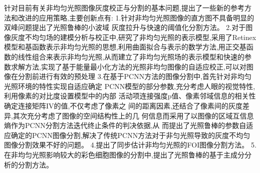 \documentclass{amsart}
\begin{document}
\cite{魏伟一}针对目前有关非均匀光照图像灰度校正与分割的基本问题,提出了一些新的参考方法和改进的应用策略,主要创新点有:
1.针对非均匀光照图像的直方图不具备明显的双峰问题提出了光照鲁棒的小波域
灰度拉升与快速的阈值化分割方法。
2.对于图像灰度不均匀场的建模分析与校正中,研究了非均匀光照的表示模型,采用了Retinex模型和基函数表示非均匀光照的思想,利用曲面拟合与表示的数学方法,用正交基函数的线性组合来表示非均匀光照,从而建立了非均匀光照场的表示模型和快速的参数求解方法,实现了基于能量最小化方法的光照非均匀图像的自适应校正,可以对图像在分割前进行有效的预处理
3.在基于PCNN方法的图像分割中,首先针对非均匀光照环境的特性实现自适应确定
PCNN模型的部分参数,充分考虑人眼的视觉特性,利用像素的对比度设置模型中的内部
活动项连接强度p值、像素邻域信息的相关性确定连接矩阵IV的值,不仅考虑了像素之
间的距离因素,还结合了像素间的灰度差异,其次充分考虑了图像的空间结构性上的几
何信息而采用了以图像的区域互信息熵作为PCNN分割方法迭代终止条件的判决依据,从
而提出了光照鲁棒的参数自适应确定的PCNN图像分割,解决了传统PCNN方法对于非匀光照导致的灰度不均匀图像分割效果不好的问题。
4.提出了同步估计非均匀光照的FOI图像分割方法。
5.在非均匀光照影响较大的彩色细胞图像的分割中,提出了光照鲁棒的基于主成分分析的分割方法。
\end{document}
